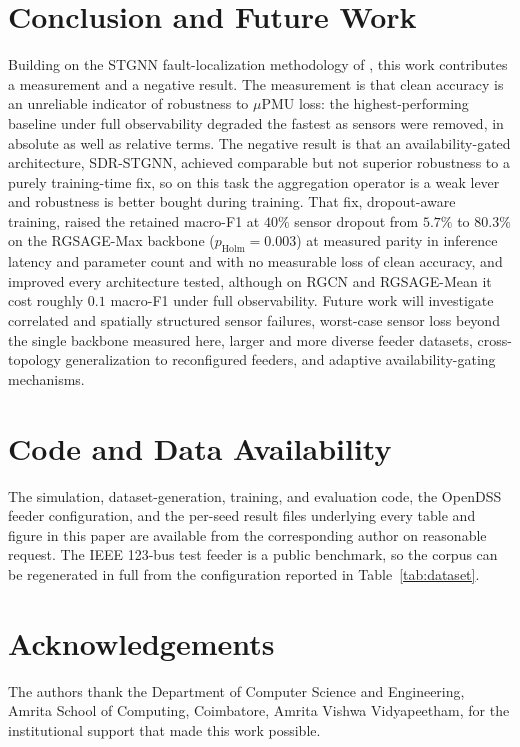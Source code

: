 \documentclass[3p,times,procedia]{elsarticle}
\begin{document}
\section{Conclusion and Future Work}
\label{sec:conclusion}

Building on the STGNN fault-localization methodology of \cite{Karabulut2026}, this work contributes a measurement and a negative result. The measurement is that clean accuracy is an unreliable indicator of robustness to $\mu$PMU loss: the highest-performing baseline under full observability degraded the fastest as sensors were removed, in absolute as well as relative terms. The negative result is that an availability-gated architecture, SDR-STGNN, achieved comparable but not superior robustness to a purely training-time fix, so on this task the aggregation operator is a weak lever and robustness is better bought during training. That fix, dropout-aware training, raised the retained macro-F1 at $40\%$ sensor dropout from $5.7\%$ to $80.3\%$ on the RGSAGE-Max backbone ($p_{\text{Holm}}=0.003$) at measured parity in inference latency and parameter count and with no measurable loss of clean accuracy, and improved every architecture tested, although on RGCN and RGSAGE-Mean it cost roughly $0.1$ macro-F1 under full observability. Future work will investigate correlated and spatially structured sensor failures, worst-case sensor loss beyond the single backbone measured here, larger and more diverse feeder datasets, cross-topology generalization to reconfigured feeders, and adaptive availability-gating mechanisms.

\section*{Code and Data Availability}

The simulation, dataset-generation, training, and evaluation code, the OpenDSS
feeder configuration, and the per-seed result files underlying every table and
figure in this paper are available from the corresponding author on reasonable
request. The IEEE 123-bus test feeder is a public benchmark, so the corpus can
be regenerated in full from the configuration reported in Table~\ref{tab:dataset}.

\section*{Acknowledgements}

The authors thank the Department of Computer Science and Engineering, Amrita School of Computing, Coimbatore, Amrita Vishwa Vidyapeetham, for the institutional support that made this work possible.
\end{document}
